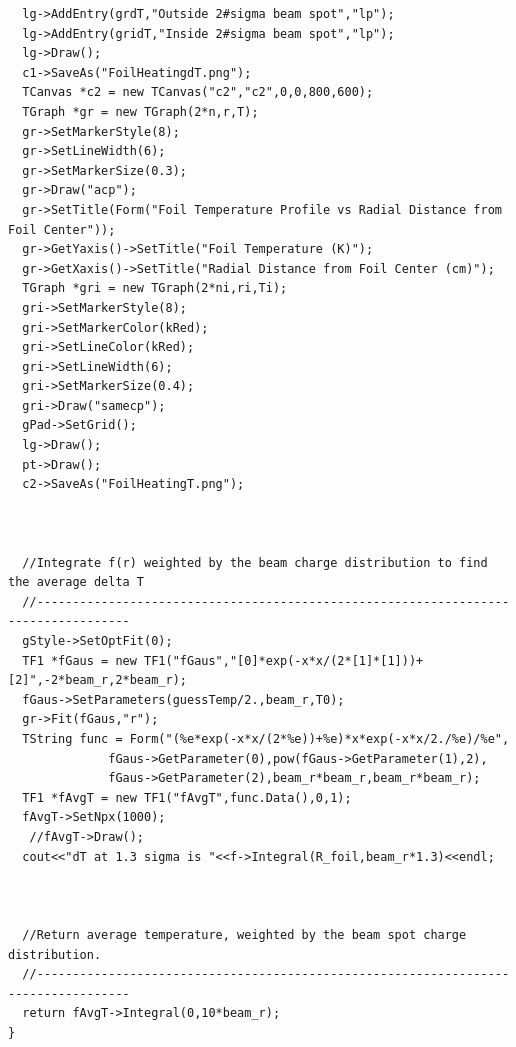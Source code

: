 \documentclass[12pt]{article}
\begin{document}
\begin{lstlisting}
  lg->AddEntry(grdT,"Outside 2#sigma beam spot","lp");
  lg->AddEntry(gridT,"Inside 2#sigma beam spot","lp");
  lg->Draw();
  c1->SaveAs("FoilHeatingdT.png");
  TCanvas *c2 = new TCanvas("c2","c2",0,0,800,600);
  TGraph *gr = new TGraph(2*n,r,T);
  gr->SetMarkerStyle(8);
  gr->SetLineWidth(6);
  gr->SetMarkerSize(0.3);
  gr->Draw("acp");
  gr->SetTitle(Form("Foil Temperature Profile vs Radial Distance from Foil Center"));
  gr->GetYaxis()->SetTitle("Foil Temperature (K)");
  gr->GetXaxis()->SetTitle("Radial Distance from Foil Center (cm)");
  TGraph *gri = new TGraph(2*ni,ri,Ti);
  gri->SetMarkerStyle(8);
  gri->SetMarkerColor(kRed);
  gri->SetLineColor(kRed);
  gri->SetLineWidth(6);
  gri->SetMarkerSize(0.4);
  gri->Draw("samecp");
  gPad->SetGrid();
  lg->Draw();
  pt->Draw();
  c2->SaveAs("FoilHeatingT.png");

  

  //Integrate f(r) weighted by the beam charge distribution to find the average delta T 
  //-----------------------------------------------------------------------------------
  gStyle->SetOptFit(0);
  TF1 *fGaus = new TF1("fGaus","[0]*exp(-x*x/(2*[1]*[1]))+[2]",-2*beam_r,2*beam_r);
  fGaus->SetParameters(guessTemp/2.,beam_r,T0);
  gr->Fit(fGaus,"r");
  TString func = Form("(%e*exp(-x*x/(2*%e))+%e)*x*exp(-x*x/2./%e)/%e",
		      fGaus->GetParameter(0),pow(fGaus->GetParameter(1),2),
		      fGaus->GetParameter(2),beam_r*beam_r,beam_r*beam_r);
  TF1 *fAvgT = new TF1("fAvgT",func.Data(),0,1);
  fAvgT->SetNpx(1000);
   //fAvgT->Draw();
  cout<<"dT at 1.3 sigma is "<<f->Integral(R_foil,beam_r*1.3)<<endl;

  

  //Return average temperature, weighted by the beam spot charge distribution.
  //-----------------------------------------------------------------------------------
  return fAvgT->Integral(0,10*beam_r);
}
\end{lstlisting}
\end{document}
